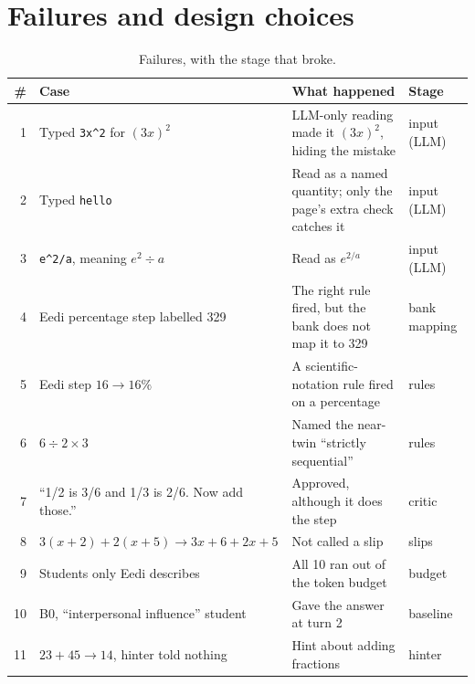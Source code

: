 \documentclass[11pt,a4paper]{article}
\newcommand{\code}[1]{\texttt{#1}}
\begin{document}
\section{Failures and design choices}
\begin{table}[H]
\centering\small
\begin{tabularx}{\linewidth}{@{}rP{4.4cm}YP{2.1cm}@{}}
\toprule
\# & Case & What happened & Stage \\
 & Typed \code{3x\^{}2} for $(3x)^2$ & LLM-only reading made it $(3x)^2$, hiding the mistake & input (LLM) \\
2 & Typed \code{hello} & Read as a named quantity; only the page's extra check catches it & input (LLM) \\
3 & \code{e\^{}2/a}, meaning $e^2 \div a$ & Read as $e^{2/a}$ & input (LLM) \\
4 & Eedi percentage step labelled 329 & The right rule fired, but the bank does not map it to 329 & bank mapping \\
5 & Eedi step $16 \to 16\%$ & A scientific-notation rule fired on a percentage & rules \\
6 & $6 \div 2 \times 3$ & Named the near-twin ``strictly sequential'' & rules \\
7 & ``1/2 is 3/6 and 1/3 is 2/6. Now add those.'' & Approved, although it does the step & critic \\
8 & $3(x+2) + 2(x+5) \to 3x+6+2x+5$ & Not called a slip & slips \\
9 & Students only Eedi describes & All 10 ran out of the token budget & budget \\
10 & B0, ``interpersonal influence'' student & Gave the answer at turn 2 & baseline \\
11 & $23 + 45 \to 14$, hinter told nothing & Hint about adding fractions & hinter \\
\bottomrule
\end{tabularx}
\caption{Failures, with the stage that broke.}
\label{tab:failures}
\end{table}
\end{document}
